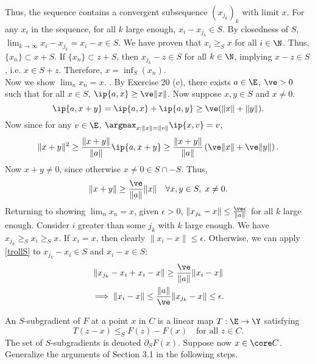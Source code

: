 \documentclass[../borwein-lewis_notes.tex]{subfiles}
\begin{document}
\begin{enumerate}[(a)]
{Thus, the sequence contains a convergent subsequence $(x_{j_k})_k$
 with limit $x$. For any $x_i$ in the sequence, for all $k$ large enough, 
$x_i - x_{j_k} \in S$. By closedness of $S$, $\lim_{k\to\infty} 
x_i-x_{j_k} = x_i - x \in S$. We have proven that $x_i \geq_S x$ for 
all $i\in\N$. Thus, $\{x_n\} \subset x+S$. If $\{x_n\}\subset z+S$, 
then $x_{j_k} - z \in S$ for all $k\in\N$, implying $x-z\in S$, i.e. 
$x\in S+z$. Therefore, $x=\inf_S(x_n)$. \\
Now we show $\lim_n x_n = x$. . By Exercise 20 (e), there exists $a\in\E$,
$\ve>0$ such 
that for all $x\in S$, $\ip{a,x}\geq \ve\|x\|$. Now suppose $x,y\in S$
and $x\neq 0$.
\begin{equation*}
\ip{a,x+y} = \ip{a,x} + \ip{a,y} \geq \ve(\|x\|+\|y\|).
\end{equation*}
Now since for any $v\in\E$, $\argmax_{x:\|x\|=\|v\|}\ip{x,v} = v$,
\begin{equation*}
\|x+y\|^2 \geq \frac{\|x+y\|}{\|a\|}\ip{a,x+y} \geq \frac{\|x+y\|}{\|a\|}
\left(\ve\|x\|+\ve\|y\|\right).
\end{equation*}
Now $x+y\neq 0$, since otherwise $x\neq 0\in S\cap -S$. Thus, 
\begin{equation}
\label{trollS}
\|x+y\| \geq \frac{\ve}{\|a\|}\|x\| \quad \forall x,y\in S,\; x\neq 0.
\end{equation}
Returning to showing $\lim_n x_n=x$, given $\epsilon > 0$, 
$\|x_{j_k} - x\|\leq \frac{\ve \epsilon}{\|a\|}$ for all $k$ large enough.
Consider $i$ greater than some $j_k$ with $k$ large enough. We 
have $x_{j_k} \geq_S  x_i \geq_S x$. If $x_i = x$, then clearly 
$\|x_i-x\|\leq \epsilon$. Otherwise, we can apply \eqref{trollS} 
to $x_{j_k}-x_i\in S$ and $x_i-x\in S$:
\begin{gather*}
\|x_{j_k} -x_i +x_i-x\| \geq \frac{\ve}{\|a\|}\|x_i-x\|\\
\implies \|x_i-x\|\leq \frac{\|a\|}{\ve}\|x_{j_k}-x\|
\leq \epsilon.
\end{gather*}
}
\end{enumerate}
An $S$-subgradient of $F$ at a point $x$ in $C$ is a linear map 
$T:\E\to\Y$ satisfying 
\begin{equation*}
T(z-x) \leq_S F(z) - F(x) \quad \text{for all }z\in C.
\end{equation*}
The set of $S$-subgradients is denoted $\partial_SF(x)$. Suppose now 
$x\in\core C$. Generalize the arguments of Section 3.1 in the following 
steps.
\end{document}
